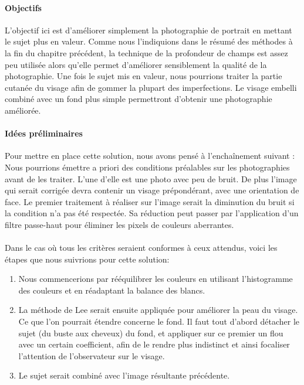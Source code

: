 \documentclass[11pt, french]{report-rd-info}
\begin{document}
\paragraph{Objectifs}
L’objectif ici est d’améliorer simplement la photographie de portrait en mettant le sujet plus en valeur. Comme nous l’indiquions dans le résumé des méthodes à la fin du chapitre précédent, la technique de la profondeur de champs est assez peu utilisée alors qu’elle permet d’améliorer sensiblement la qualité de la photographie. Une fois le sujet mis en valeur, nous pourrions traiter la partie cutanée du visage afin de gommer la plupart des imperfections. Le visage embelli combiné avec un fond plus simple permettront d’obtenir une photographie améliorée.

\paragraph{Idées préliminaires}
Pour mettre en place cette solution, nous avons pensé à l'enchaînement suivant : 
Nous pourrions émettre a priori des conditions préalables sur les photographies avant de les traiter. L’une d’elle est une photo avec peu de bruit. De plus l’image qui serait corrigée devra contenir un visage prépondérant, avec une orientation de face. 
Le premier traitement à réaliser sur l’image serait la diminution du bruit si la condition n’a pas été respectée. Sa réduction peut passer par l’application d’un filtre passe-haut pour éliminer les pixels de couleurs aberrantes. 

\paragraph{}
Dans le cas où tous les critères seraient conformes à ceux attendus, voici les étapes que nous suivrions pour cette solution: 
\begin{enumerate}
\item Nous commencerions par rééquilibrer les couleurs en utilisant l’histogramme des couleurs et en réadaptant la balance des blancs.
\item La méthode de Lee serait ensuite appliquée pour améliorer la peau du visage. Ce que l’on pourrait étendre concerne le fond. Il faut tout d’abord détacher le sujet (du buste aux cheveux) du fond, et appliquer sur ce premier un flou avec un certain coefficient, afin de le rendre plus indistinct et ainsi focaliser l’attention de l’observateur sur le visage.
\item Le sujet serait combiné avec l’image résultante précédente.
\end{enumerate}
\end{document}
